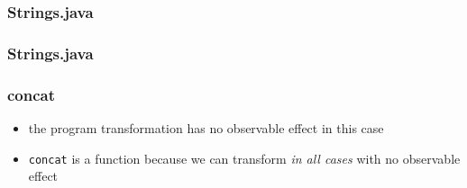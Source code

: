 \begin{frame}[fragile]
\frametitle{Strings.java}

\end{frame}

\begin{frame}[fragile]
\frametitle{Strings.java}

\end{frame}

\begin{frame}[fragile]
\frametitle{concat}
\begin{itemize}
  \item<1> the program transformation has no observable effect in this case
  \item<2> \lstinline$concat$ is a function because we can transform \emph{in all cases} with no observable effect
\end{itemize}
\end{frame}
